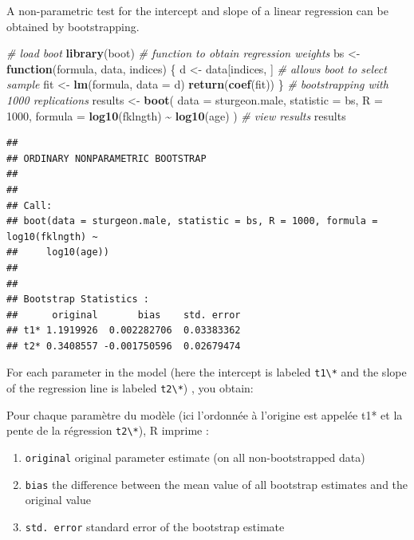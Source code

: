 \documentclass[
  12pt,
]{book}
\newenvironment{Shaded}{\begin{snugshade}}{\end{snugshade}}
\newcommand{\CommentTok}[1]{\textcolor[rgb]{0.56,0.35,0.01}{\textit{#1}}}
\newcommand{\ControlFlowTok}[1]{\textcolor[rgb]{0.13,0.29,0.53}{\textbf{#1}}}
\newcommand{\DataTypeTok}[1]{\textcolor[rgb]{0.13,0.29,0.53}{#1}}
\newcommand{\DecValTok}[1]{\textcolor[rgb]{0.00,0.00,0.81}{#1}}
\newcommand{\KeywordTok}[1]{\textcolor[rgb]{0.13,0.29,0.53}{\textbf{#1}}}
\newcommand{\NormalTok}[1]{#1}
\newcommand{\OperatorTok}[1]{\textcolor[rgb]{0.81,0.36,0.00}{\textbf{#1}}}
\newcommand{\StringTok}[1]{\textcolor[rgb]{0.31,0.60,0.02}{#1}}
\providecommand{\tightlist}{%
  \setlength{\itemsep}{0pt}\setlength{\parskip}{0pt}}
\begin{document}
A non-parametric test for the intercept and slope of a linear regression can be obtained by bootstrapping.

\begin{Shaded}
\begin{Highlighting}[]
\CommentTok{\# load boot}
\KeywordTok{library}\NormalTok{(boot)}
\CommentTok{\# function to obtain regression weights}
\NormalTok{bs \textless{}{-}}\StringTok{ }\ControlFlowTok{function}\NormalTok{(formula, data, indices) \{}
\NormalTok{  d \textless{}{-}}\StringTok{ }\NormalTok{data[indices, ] }\CommentTok{\# allows boot to select sample}
\NormalTok{  fit \textless{}{-}}\StringTok{ }\KeywordTok{lm}\NormalTok{(formula, }\DataTypeTok{data =}\NormalTok{ d)}
  \KeywordTok{return}\NormalTok{(}\KeywordTok{coef}\NormalTok{(fit))}
\NormalTok{\}}
\CommentTok{\# bootstrapping with 1000 replications}
\NormalTok{results \textless{}{-}}\StringTok{ }\KeywordTok{boot}\NormalTok{(}
  \DataTypeTok{data =}\NormalTok{ sturgeon.male,}
  \DataTypeTok{statistic =}\NormalTok{ bs,}
  \DataTypeTok{R =} \DecValTok{1000}\NormalTok{, }\DataTypeTok{formula =} \KeywordTok{log10}\NormalTok{(fklngth) }\OperatorTok{\textasciitilde{}}\StringTok{ }\KeywordTok{log10}\NormalTok{(age)}
\NormalTok{)}
\CommentTok{\# view results}
\NormalTok{results}
\end{Highlighting}
\end{Shaded}

\begin{verbatim}
## 
## ORDINARY NONPARAMETRIC BOOTSTRAP
## 
## 
## Call:
## boot(data = sturgeon.male, statistic = bs, R = 1000, formula = log10(fklngth) ~ 
##     log10(age))
## 
## 
## Bootstrap Statistics :
##      original       bias    std. error
## t1* 1.1919926  0.002282706  0.03383362
## t2* 0.3408557 -0.001750596  0.02679474
\end{verbatim}

For each parameter in the model (here the intercept is labeled \texttt{t1\textbackslash{}*} and the slope of the regression line is labeled \texttt{t2\textbackslash{}*}) , you obtain:

Pour chaque paramètre du modèle (ici l'ordonnée à l'origine est
appelée t1* et la pente de la régression \texttt{t2\textbackslash{}*}), R imprime :

\begin{enumerate}
\def\labelenumi{\arabic{enumi}.}
\tightlist
\item
  \texttt{original} original parameter estimate (on all non-bootstrapped data)
\item
  \texttt{bias} the difference between the mean value of all bootstrap estimates and the original value
\item
  \texttt{std.\ error} standard error of the bootstrap estimate
\end{enumerate}
\end{document}
